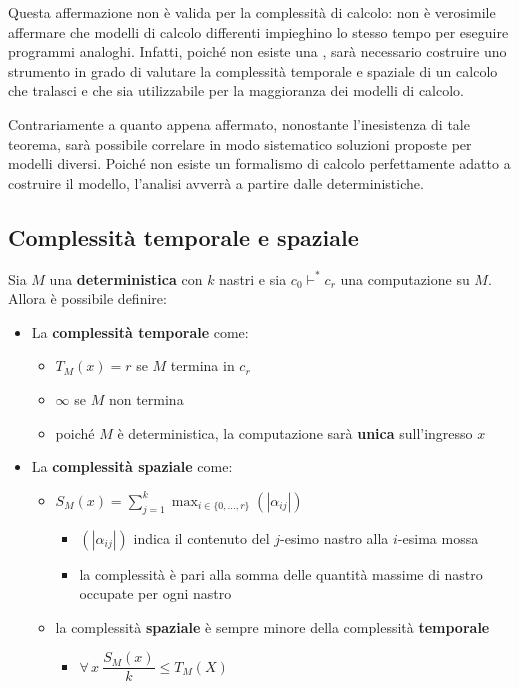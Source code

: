 \documentclass[italian, 10pt]{article}
\begin{document}
Questa affermazione non è valida per la complessità di calcolo: non è verosimile affermare che modelli di calcolo differenti impieghino lo stesso tempo per eseguire programmi analoghi.
Infatti, poiché non esiste una , sarà necessario costruire uno strumento in grado di valutare la complessità temporale e spaziale di un calcolo che tralasci  e che sia utilizzabile per la maggioranza dei modelli di calcolo.

Contrariamente a quanto appena affermato, nonostante l'inesistenza di tale teorema, sarà possibile correlare in modo sistematico soluzioni proposte per modelli diversi.
Poiché non esiste un formalismo di calcolo perfettamente adatto a costruire il modello, l'analisi avverrà a partire dalle \TM deterministiche.

\subsection{Complessità temporale e spaziale}

Sia \(M\) una \TM \textbf{deterministica} con \(k\) nastri e sia \(c_0 \vdash^\ast c_r\) una computazione su \(M\).
Allora è possibile definire:

\begin{itemize}
  \item La \textbf{complessità temporale} come:
        \begin{itemize}
          \item \(T_M(x) = r\) se \(M\) termina in \(c_r\)
          \item \(\infty\) se \(M\) non termina
          \item poiché \(M\) è deterministica, la computazione sarà \textbf{unica} sull'ingresso \(x\)
        \end{itemize}
  \item La \textbf{complessità spaziale} come:
        \begin{itemize}
          \item \(\displaystyle S_M(x) = \sum^k_{j=1} \max_{i \in \{0, \ldots, r\}} \left(|\alpha_{ij}|\right)\)
                \begin{itemize}[label=\(\rightarrow\)]
                  \item \(\left(|\alpha_{ij}|\right)\) indica il contenuto del \(j\)-esimo nastro alla \(i\)-esima mossa
                  \item la complessità è pari alla somma delle quantità massime di nastro occupate per ogni nastro
                \end{itemize}
          \item la complessità \textbf{spaziale} è sempre minore della complessità \textbf{temporale}
                \begin{itemize}[label=\(\rightarrow\)]
                  \item \(\forall \, x \ \dfrac{S_M(x)}{k} \leq T_M(X)\)
                \end{itemize}
        \end{itemize}
\end{itemize}
\end{document}
